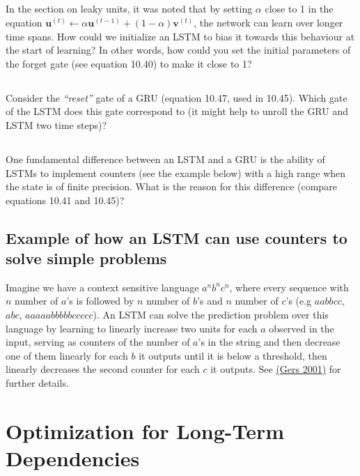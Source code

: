 \documentclass[a4paper]{report} \usepackage{amsmath}
\renewcommand{\vec}[1]{{\boldsymbol{#1}}}
\newcommand{\tvec}[2]{{\vec{#1}^{(#2)}}}
\begin{document}
    \subsection{}
    In the section on leaky units, it was noted that by setting
    $\alpha$ close to 1 in the equation $\tvec{u}{t} \leftarrow \alpha
    \tvec{u}{t-1} + (1-\alpha)\tvec{v}{t}$, the network can learn over
    longer time spans. How could we initialize an LSTM to bias it
    towards this behaviour at the start of learning? In other words,
    how could you set the initial parameters of the forget gate (see
    equation 10.40) to make it close to 1?


    \subsection{}
    Consider the \emph{``reset''} gate of a GRU (equation 10.47, used
    in 10.45). Which gate of the LSTM does this gate correspond to (it
    might help to unroll the GRU and LSTM two time steps)?

    \subsection{}
    One fundamental difference between an LSTM and a GRU is the
    ability of LSTMs to implement counters (see the example below)
    with a high range when the state is of finite precision. What is
    the reason for this difference (compare equations 10.41 and
    10.45)?


    \subsection*{Example of how an LSTM can use counters to solve simple problems}
    \label{csl}
    Imagine we have a context sensitive language $a^nb^nc^n$, where
    every sequence with $n$ number of $a$'s is followed by $n$ number
    of $b$'s and $n$ number of $c$'s (e.g $aabbcc$, $abc$,
    $aaaaabbbbbccccc$). An LSTM can solve the prediction problem over
    this language by learning to linearly increase two units for each
    $a$ observed in the input, serving as counters of the number of
    $a$'s in the string and then decrease one of them linearly for
    each $b$ it outputs until it is below a threshold, then linearly
    decreases the second counter for each $c$ it outputs. See
    \href{ftp://ftp.idsia.ch/pub/juergen/L-IEEE.pdf}{(Gers 2001)} for
    further details.


    \section{Optimization for Long-Term Dependencies}
\end{document}
